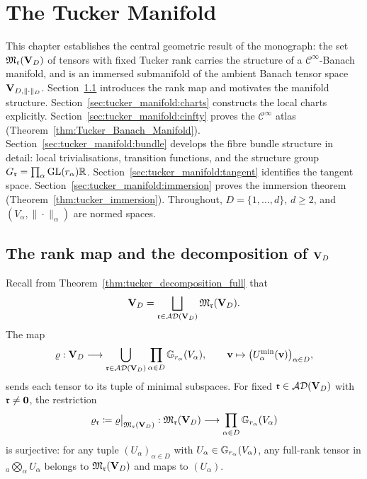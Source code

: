 %
%

\chapter{The Tucker Manifold}
\label{chap:tucker_manifold}

This chapter establishes the central geometric result of the monograph:
the set $\mathfrak{M}_{\mathfrak{r}}(\mathbf{V}_D)$ of tensors with fixed Tucker rank carries
the structure of a $\mathcal{C}^\infty$-Banach manifold, and is an
immersed submanifold of the ambient Banach tensor space $\mathbf{V}_{D,\|\cdot\|_D}$.
Section~\ref{sec:tucker_manifold:decomp} introduces the rank map and
motivates the manifold structure.
Section~\ref{sec:tucker_manifold:charts} constructs the local charts
explicitly. Section~\ref{sec:tucker_manifold:cinfty} proves the
$\mathcal{C}^\infty$ atlas (Theorem~\ref{thm:Tucker_Banach_Manifold}).
Section~\ref{sec:tucker_manifold:bundle} develops the fibre bundle
structure in detail: local trivialisations, transition functions, and
the structure group $G_{\mathfrak{r}} = \prod_\alpha \mathrm{GL}(r_\alpha){\mathbb{R}}$.
Section~\ref{sec:tucker_manifold:tangent} identifies the tangent space.
Section~\ref{sec:tucker_manifold:immersion} proves the immersion theorem
(Theorem~\ref{thm:tucker_immersion}).
Throughout, $D = \{1,\ldots,d\}$, $d \geq 2$, and $(V_\alpha,
\|\cdot\|_\alpha)$ are normed spaces.

\section{The rank map and the decomposition of $\mathbf{V}_D$}
\label{sec:tucker_manifold:decomp}

Recall from Theorem~\ref{thm:tucker_decomposition_full} that
\begin{equation*}
    \mathbf{V}_D = \bigsqcup_{\mathfrak{r} \in \mathcal{AD}(\mathbf{V}_D)} \mathfrak{M}_{\mathfrak{r}}(\mathbf{V}_D).
\end{equation*}
The map
\begin{equation}
\label{eq:rank_map}
    \varrho : \mathbf{V}_D \longrightarrow
    \bigcup_{\mathfrak{r} \in \mathcal{AD}(\mathbf{V}_D)}
    \prod_{\alpha \in D} \mathbb{G}_{r_\alpha}(V_\alpha),
    \qquad
    \mathbf{v} \mapsto \bigl(U^{\min}_{\alpha}(\mathbf{v})\bigr)_{\alpha \in D},
\end{equation}
sends each tensor to its tuple of minimal subspaces. For fixed
$\mathfrak{r} \in \mathcal{AD}(\mathbf{V}_D)$ with $\mathfrak{r} \neq \mathbf{0}$, the restriction
\begin{equation}
\label{eq:rank_map_restricted}
    \varrho_{\mathfrak{r}} \coloneqq \varrho\big|_{\mathfrak{M}_{\mathfrak{r}}(\mathbf{V}_D)} :
    \mathfrak{M}_{\mathfrak{r}}(\mathbf{V}_D) \longrightarrow
    \prod_{\alpha \in D} \mathbb{G}_{r_\alpha}(V_\alpha)
\end{equation}
is surjective: for any tuple $(U_\alpha)_{\alpha \in D}$ with
$U_\alpha \in \mathbb{G}_{r_\alpha}(V_\alpha)$, any full-rank tensor in
${}_a\bigotimes_\alpha U_\alpha$ belongs to $\mathfrak{M}_{\mathfrak{r}}(\mathbf{V}_D)$ and
maps to $(U_\alpha)$.

